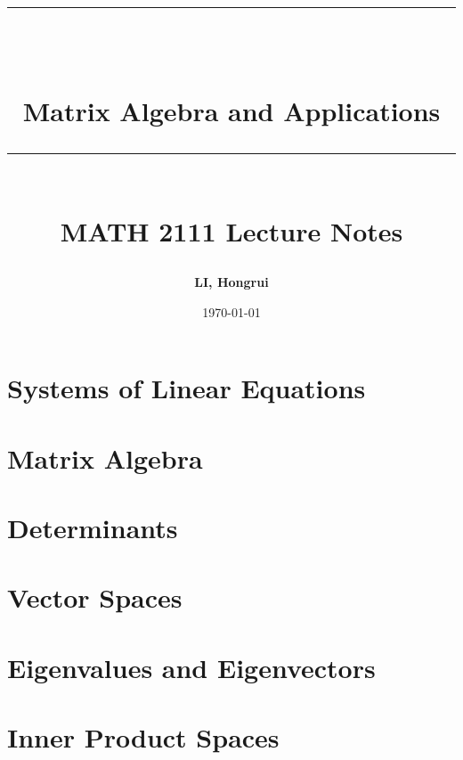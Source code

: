 \documentclass[10pt, a4paper]{article}
\newcommand{\HRule}[1]{\rule{\linewidth}{#1}}
\begin{document}
\title{ \normalsize \textsc{}
\\ [2.0cm]
\HRule{1.5pt} \\ [0.3cm]
\LARGE {\textbf{Matrix Algebra and Applications}
\HRule{1.5pt} \\ [0.6cm]
\LARGE{\textbf{MATH 2111 Lecture Notes}} \vspace*{10\baselineskip}}
}
\date{\today}
\author{\textbf{LI, Hongrui}}  %
\maketitle

\clearpage
\tableofcontents
\newpage


\section{Systems of Linear Equations}
\section{Matrix Algebra}
\section{Determinants}
\section{Vector Spaces}
\section{Eigenvalues and Eigenvectors}
\newpage



\section{Inner Product Spaces}
\end{document}
